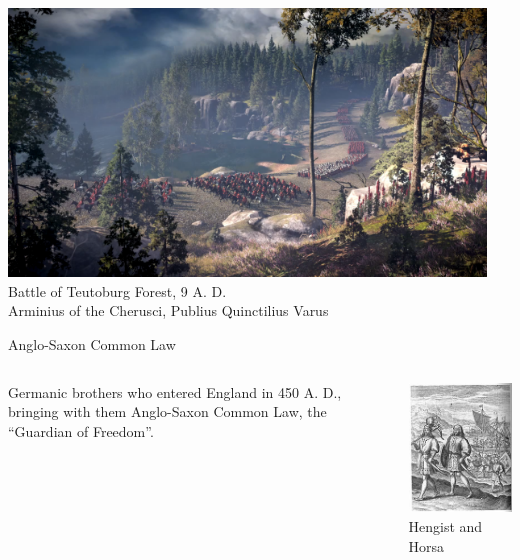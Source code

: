 \begin{frame}
    \centering
    \includegraphics[width=0.95\textwidth]{img/teut5.png} \\
    Battle of Teutoburg Forest, 9 A. D. \\
        Arminius of the Cherusci, Publius Quinctilius Varus \\
\end{frame}

\begin{frame}{Anglo-Saxon Common Law}
    \begin{columns}[onlytextwidth]
            Germanic brothers who entered England in 450 A. D., bringing with them Anglo-Saxon Common Law, the ``Guardian of Freedom''.

            \centering
            \includegraphics[height=0.55\textheight]{img/hengist-horsa.png} \\
            Hengist and Horsa \\
    \end{columns}
\end{frame}

